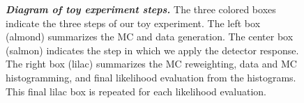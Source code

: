 \documentclass{article}
\begin{document}
\begin{figure}[htp]
{
	}%
	\caption{\textbf{\textit{Diagram of toy experiment steps.}} The three colored boxes indicate the three steps of our toy experiment.
		The left box (almond) summarizes the MC and data generation.
		The center box (salmon) indicates the step in which we apply the detector response.
		The right box (lilac) summarizes the MC reweighting, data and MC histogramming, and final likelihood evaluation from the histograms.
		This final lilac box is repeated for each likelihood evaluation.}
	\label{fig:analysis_overview}
\end{figure}
\end{document}
